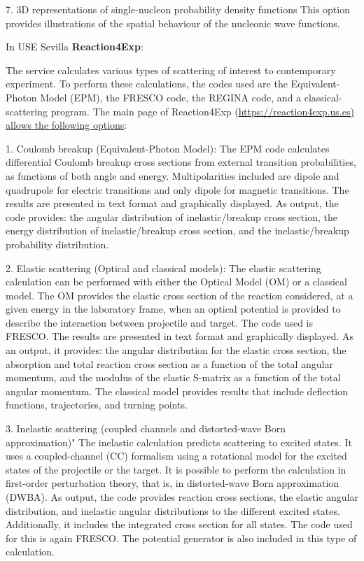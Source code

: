 7. 3D representations of single-nucleon probability density functions
This option provides illustrations of the spatial behaviour of the nucleonic wave functions.



In USE Sevilla \textbf{Reaction4Exp}: 

The service calculates various types of scattering of interest to contemporary experiment. To perform these calculations, the codes used are the Equivalent-Photon Model (EPM), the FRESCO code, the REGINA code, and a classical-scattering program. The main page of Reaction4Exp (\url{https://reaction4exp.us.es) allows the following options}:


1. Coulomb breakup (Equivalent-Photon Model): 
The EPM code calculates differential Coulomb breakup cross sections from external transition probabilities, as functions of both angle and energy. Multipolarities included are dipole and quadrupole for electric transitions and only dipole for magnetic transitions. The results are presented in text format and graphically displayed. As output, the code provides: the angular distribution of inelastic/breakup cross section, the energy distribution of inelastic/breakup cross section, and the inelastic/breakup probability distribution.



2. Elastic scattering (Optical and classical models):
The elastic scattering calculation can be performed with either the Optical Model (OM) or a classical model. The OM provides the elastic cross section of the reaction considered, at a given energy in the laboratory frame, when an optical potential is provided to describe the interaction between projectile and target. The code used is FRESCO. The results are presented in text format and graphically displayed. As an output, it provides: the angular distribution for the elastic cross section, the absorption and total reaction cross section as a function of the total angular momentum, and the modulus of the elastic S-matrix as a function of the total angular momentum. The classical model provides results that include deflection functions, trajectories, and turning points.



3. Inelastic scattering (coupled channels and distorted-wave Born approximation)"
The inelastic calculation predicts scattering to excited states. It uses a coupled-channel (CC) formalism using a rotational model for the excited states of the projectile or the target. It is possible to perform the calculation in first-order perturbation theory, that is, in distorted-wave Born approximation (DWBA). As output, the code provides reaction cross sections, the elastic angular distribution, and inelastic angular distributions to the different excited states. Additionally, it includes the integrated cross section for all states. The code used for this is again FRESCO. The potential generator is also included in this type of calculation.



